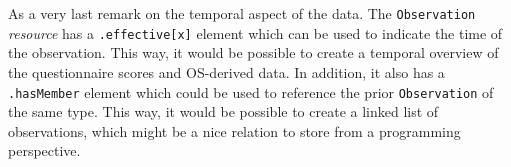 \noindent
As a very last remark on the temporal aspect of the data. The \texttt{Observation} \emph{resource} has a \texttt{.effective[x]} element which can be used to indicate the time of the observation. This way, it would be possible to create a temporal overview of the questionnaire scores and OS-derived data. In addition, it also has a \texttt{.hasMember} element which could be used to reference the prior \texttt{Observation} of the same type. This way, it would be possible to create a linked list of observations, which might be a nice relation to store from a programming perspective.

